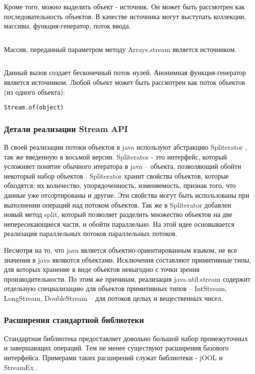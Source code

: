 Кроме того, можно выделить объект - источник. Он может быть рассмотрен как последовательность объектов. В качестве источника могут выступать коллекции, массивы, функция-генератор, поток ввода.
\inputminted{java}{chapter1/code/IntStream.java}
Массив, переданный параметром методу Arrays.stream является источником.
\inputminted{java}{chapter1/code/ZerosStream.java}
Данный вызов создает бесконечный поток нулей. Анонимная функция-генератор является источником.
Любой объект может быть рассмотрен как поток объектов (из одного объекта):

\texttt{Stream.of(object)}

\subsubsection{Детали реализации Stream API}
В своей реализации потоки объектов в java используют абстракцию Spliterator 
\cite{java:spliterator}, так же введенную в восьмой версии. Spliterator - это интерфейс, 
который усложняет понятие обычного итератора в java -- объекта, позволяющий обойти 
некоторый набор объектов \cite{java:iterator}. Spliterator хранит свойства объектов, которые 
обходятся: их количество, упорядоченность, изменяемость, признак того, что данные уже 
отсортированы и другие. Эти свойства могут быть использованы при выполнении операций над 
потоком объектов. Так же в Spliterator добавлен новый метод split, который позволяет 
разделить множество объектов на две непересекающиеся части, и обойти параллельно. На этой идее основывается реализация параллельных потоков параллельных потоков.

Несмотря на то, что java является объектно-ориентированным языком, не все значения в java 
являются объектами. Исключения составляют примитивные типы, для которых хранение в виде 
объектов невыгодно с точки зрения производительности. По этим же причинам, реализация 
java.util.stream содержит отдельную специализацию для объектов примитивных типов -- IntStream, 
LongStream, DoubleStream -- для потоков целых и вещественных чисел. 

\subsubsection{Расширения стандартной библиотеки}
Стандартная библиотека предоставляет довольно большой набор промежуточных и завершающих операций. Тем не менее существуют расширения базового интерфейса. Примерами таких расширений служат библиотеки - jOOL \cite{java:jool} и StreamEx \cite{java:streamex}.

